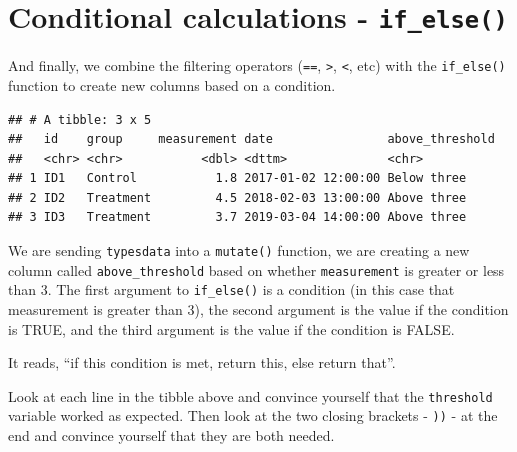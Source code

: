 \documentclass[
  12pt,
  krantz2]{krantz}
\makeatletter
\newenvironment{Shaded}{\begin{snugshade}}{\end{snugshade}}
\newcommand{\DataTypeTok}[1]{\textcolor[rgb]{0.13,0.29,0.53}{#1}}
\newcommand{\DecValTok}[1]{\textcolor[rgb]{0.00,0.00,0.81}{#1}}
\newcommand{\KeywordTok}[1]{\textcolor[rgb]{0.13,0.29,0.53}{\textbf{#1}}}
\newcommand{\NormalTok}[1]{#1}
\newcommand{\OperatorTok}[1]{\textcolor[rgb]{0.81,0.36,0.00}{\textbf{#1}}}
\newcommand{\StringTok}[1]{\textcolor[rgb]{0.31,0.60,0.02}{#1}}
\newenvironment{kframe}{%
\medskip{}
\setlength{\fboxsep}{.8em}
 \def\at@end@of@kframe{}%
 \ifinner\ifhmode%
  \def\at@end@of@kframe{\end{minipage}}%
  \begin{minipage}{\columnwidth}%
 \fi\fi%
 \def\FrameCommand##1{\hskip\@totalleftmargin \hskip-\fboxsep
 \colorbox{shadecolor}{##1}\hskip-\fboxsep
     \hskip-\linewidth \hskip-\@totalleftmargin \hskip\columnwidth}%
 \MakeFramed {\advance\hsize-\width
   \@totalleftmargin\z@ \linewidth\hsize
   \@setminipage}}%
 {\par\unskip\endMakeFramed%
 \at@end@of@kframe}
\renewenvironment{Shaded}{\begin{kframe}}{\end{kframe}}
\makeatother
\begin{document}
\hypertarget{conditional-calculations---if_else}{%
\section{\texorpdfstring{Conditional calculations - \texttt{if\_else()}}{Conditional calculations - if\_else()}}\label{conditional-calculations---if_else}}

And finally, we combine the filtering operators (\texttt{==}, \texttt{\textgreater{}}, \texttt{\textless{}}, etc) with the \texttt{if\_else()} function to create new columns based on a condition.

\begin{Shaded}
\end{Shaded}

\begin{verbatim}
## # A tibble: 3 x 5
##   id    group     measurement date                above_threshold
##   <chr> <chr>           <dbl> <dttm>              <chr>          
## 1 ID1   Control           1.8 2017-01-02 12:00:00 Below three    
## 2 ID2   Treatment         4.5 2018-02-03 13:00:00 Above three    
## 3 ID3   Treatment         3.7 2019-03-04 14:00:00 Above three
\end{verbatim}

We are sending \texttt{typesdata} into a \texttt{mutate()} function, we are creating a new column called \texttt{above\_threshold} based on whether \texttt{measurement} is greater or less than 3.
The first argument to \texttt{if\_else()} is a condition (in this case that measurement is greater than 3), the second argument is the value if the condition is TRUE, and the third argument is the value if the condition is FALSE.

It reads, ``if this condition is met, return this, else return that''.

Look at each line in the tibble above and convince yourself that the \texttt{threshold} variable worked as expected.
Then look at the two closing brackets - \texttt{))} - at the end and convince yourself that they are both needed.
\end{document}
